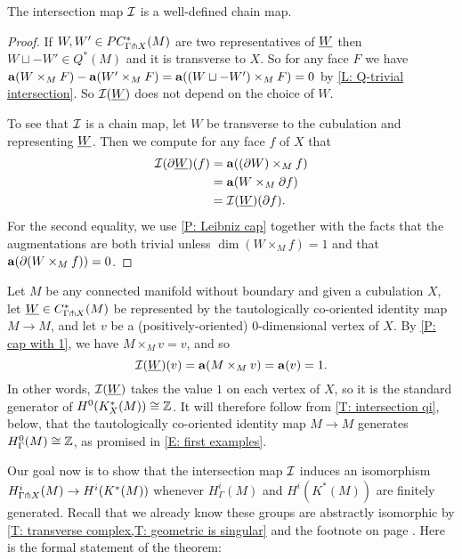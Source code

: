 \begin{proposition}
	The intersection map $\mathcal{I}$ is a well-defined chain map.
\end{proposition}

\begin{proof}
	If $W, W' \in PC^*_{\Gamma \pitchfork X}(M)$ are two representatives of $\underline{W}$ then $W \sqcup -W' \in Q^*(M)$ and it is transverse to $X$.
	So for any face $F$ we have $\mathbf{a}(W \times_M F)-\mathbf{a}(W' \times_M F) = \mathbf{a}((W \sqcup -W') \times_M F) = 0$ by \cref{L: Q-trivial intersection}.
	So $\mathcal{I}(\underline{W})$ does not depend on the choice of $W$.

	To see that $\mathcal{I}$ is a chain map, let $W$ be transverse to the cubulation and representing $\underline{W}$.
	Then we compute for any face $f$ of $X$ that
	\begin{align*}
		\mathcal{I}(\partial\underline{W})(f)& = \mathbf{a}((\partial W) \times_M f)\\
		& = \mathbf{a}(W \times_M \partial f)\\
		& = \mathcal{I}(\underline{W})(\partial f).
	\end{align*}
	For the second equality, we use \cref{P: Leibniz cap} together with the facts that the augmentations are both trivial unless $\dim(W \times_M f) = 1$ and that $\mathbf{a}(\partial (W \times_M f)) = 0$.
\end{proof}

\begin{example}\label{E: coho 0 generator}
	Let $M$ be any connected manifold without boundary and given a cubulation $X$, let $\underline{W} \in C^*_{\Gamma \pitchfork X}(M)$ be represented by the tautologically co-oriented identity map $M \to M$, and let $v$ be a (positively-oriented) $0$-dimensional vertex of $X$.
	By \cref{P: cap with 1}, we have $M \times_M v = v$, and so
	\[\mathcal{I}(\underline{W})(v) = \mathbf{a}(M \times_M v) = \mathbf{a}(v) = 1.\]
	In other words, $\mathcal{I}(\underline{W})$ takes the value $1$ on each vertex of $X$, so it is the standard generator of $H^0(K^*_X(M)) \cong \mathbb{Z}$.
	It will therefore follow from \cref{T: intersection qi}, below, that the tautologically co-oriented identity map $M \to M$ generates $H^0_\Gamma(M) \cong \mathbb{Z}$, as promised in \cref{E: first examples}.
\end{example}

Our goal now is to show that the intersection map $\mathcal{I}$ induces an isomorphism $H^i_{\Gamma \pitchfork X}(M) \to H^i(K^*(M))$ whenever $H^i_\Gamma(M)$ and $H^i(K^*(M))$ are finitely generated.
Recall that we already know these groups are abstractly isomorphic by \cref{T: transverse complex,T: geometric is singular} and the footnote on page \pageref{FN: cubical and singular}.
Here is the formal statement of the theorem:

